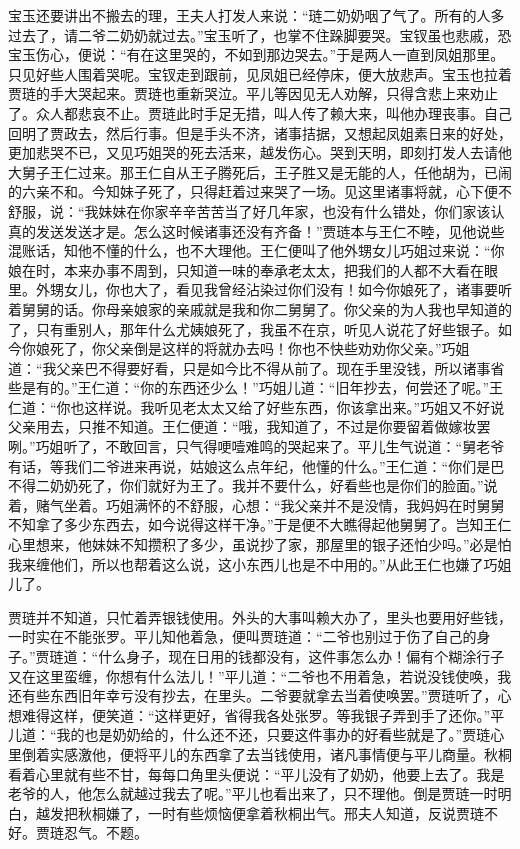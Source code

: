 \begin{parag}
    宝玉还要讲出不搬去的理，王夫人打发人来说：“琏二奶奶咽了气了。所有的人多过去了，请二爷二奶奶就过去。”宝玉听了，也掌不住跺脚要哭。宝钗虽也悲戚，恐宝玉伤心，便说：“有在这里哭的，不如到那边哭去。”于是两人一直到凤姐那里。只见好些人围着哭呢。宝钗走到跟前，见凤姐已经停床，便大放悲声。宝玉也拉着贾琏的手大哭起来。贾琏也重新哭泣。平儿等因见无人劝解，只得含悲上来劝止了。众人都悲哀不止。贾琏此时手足无措，叫人传了赖大来，叫他办理丧事。自己回明了贾政去，然后行事。但是手头不济，诸事拮据，又想起凤姐素日来的好处，更加悲哭不已，又见巧姐哭的死去活来，越发伤心。哭到天明，即刻打发人去请他大舅子王仁过来。那王仁自从王子腾死后，王子胜又是无能的人，任他胡为，已闹的六亲不和。今知妹子死了，只得赶着过来哭了一场。见这里诸事将就，心下便不舒服，说：“我妹妹在你家辛辛苦苦当了好几年家，也没有什么错处，你们家该认真的发送发送才是。怎么这时候诸事还没有齐备！”贾琏本与王仁不睦，见他说些混账话，知他不懂的什么，也不大理他。王仁便叫了他外甥女儿巧姐过来说：“你娘在时，本来办事不周到，只知道一味的奉承老太太，把我们的人都不大看在眼里。外甥女儿，你也大了，看见我曾经沾染过你们没有！如今你娘死了，诸事要听着舅舅的话。你母亲娘家的亲戚就是我和你二舅舅了。你父亲的为人我也早知道的了，只有重别人，那年什么尤姨娘死了，我虽不在京，听见人说花了好些银子。如今你娘死了，你父亲倒是这样的将就办去吗！你也不快些劝劝你父亲。”巧姐道：“我父亲巴不得要好看，只是如今比不得从前了。现在手里没钱，所以诸事省些是有的。”王仁道：“你的东西还少么！”巧姐儿道：“旧年抄去，何尝还了呢。”王仁道：“你也这样说。我听见老太太又给了好些东西，你该拿出来。”巧姐又不好说父亲用去，只推不知道。王仁便道：“哦，我知道了，不过是你要留着做嫁妆罢咧。”巧姐听了，不敢回言，只气得哽噎难鸣的哭起来了。平儿生气说道：“舅老爷有话，等我们二爷进来再说，姑娘这么点年纪，他懂的什么。”王仁道：“你们是巴不得二奶奶死了，你们就好为王了。我并不要什么，好看些也是你们的脸面。”说着，赌气坐着。巧姐满怀的不舒服，心想：“我父亲并不是没情，我妈妈在时舅舅不知拿了多少东西去，如今说得这样干净。”于是便不大瞧得起他舅舅了。岂知王仁心里想来，他妹妹不知攒积了多少，虽说抄了家，那屋里的银子还怕少吗。”必是怕我来缠他们，所以也帮着这么说，这小东西儿也是不中用的。”从此王仁也嫌了巧姐儿了。
\end{parag}


\begin{parag}
    贾琏并不知道，只忙着弄银钱使用。外头的大事叫赖大办了，里头也要用好些钱，一时实在不能张罗。平儿知他着急，便叫贾琏道：“二爷也别过于伤了自己的身子。”贾琏道：“什么身子，现在日用的钱都没有，这件事怎么办！偏有个糊涂行子又在这里蛮缠，你想有什么法儿！”平儿道：“二爷也不用着急，若说没钱使唤，我还有些东西旧年幸亏没有抄去，在里头。二爷要就拿去当着使唤罢。”贾琏听了，心想难得这样，便笑道：“这样更好，省得我各处张罗。等我银子弄到手了还你。”平儿道：“我的也是奶奶给的，什么还不还，只要这件事办的好看些就是了。”贾琏心里倒着实感激他，便将平儿的东西拿了去当钱使用，诸凡事情便与平儿商量。秋桐看着心里就有些不甘，每每口角里头便说：“平儿没有了奶奶，他要上去了。我是老爷的人，他怎么就越过我去了呢。”平儿也看出来了，只不理他。倒是贾琏一时明白，越发把秋桐嫌了，一时有些烦恼便拿着秋桐出气。邢夫人知道，反说贾琏不好。贾琏忍气。不题。
\end{parag}


